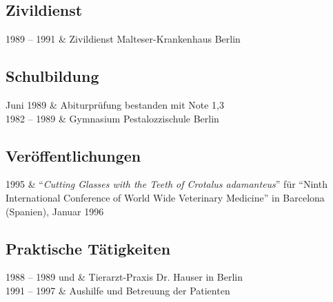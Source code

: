 \documentclass[12pt,parskip=half-]{scrartcl}
\begin{document}
\subsection{Zivildienst}

\begin{Abschnitt}
1989 -- 1991 & Zivildienst Malteser-Krankenhaus Berlin
\end{Abschnitt}

\subsection{Schulbildung}

\begin{Abschnitt}
Juni 1989    & Abiturprüfung bestanden mit Note 1,3 \\
1982 -- 1989 & Gymnasium Pestalozzischule Berlin
\end{Abschnitt}


\subsection{Veröffentlichungen}

\begin{Abschnitt}
1995 & "`\textit{Cutting Glasses with the Teeth of Crotalus adamanteus}"' für "`Ninth International Conference of World Wide Veterinary Medicine"' in Barcelona (Spanien), Januar 1996
\end{Abschnitt}

\subsection{Praktische Tätigkeiten}

\begin{Abschnitt}
1988 -- 1989 und & Tierarzt-Praxis Dr. Hauser in Berlin \\
1991 -- 1997     & Aushilfe und Betreuung der Patienten \\
\end{Abschnitt}
\end{document}
